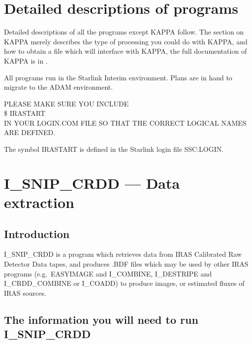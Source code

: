 \documentclass[nolof,noabs,11pt]{starlink}
\begin{document}
\section {Detailed descriptions of programs}


Detailed descriptions of all the programs except KAPPA follow. The section on
KAPPA merely describes the type of processing you could do with KAPPA, and how
to obtain a file which will interface with KAPPA, the full documentation of
KAPPA is in .

All programs run in the Starlink Interim environment. Plans are in hand to
migrate to the ADAM environment.

\begin{center}
\large{PLEASE MAKE SURE YOU INCLUDE
\\
\$ IRASTART
\\
IN YOUR LOGIN.COM FILE SO THAT THE CORRECT LOGICAL NAMES ARE DEFINED.}
\end{center}
The symbol IRASTART is defined in the Starlink login file SSC:LOGIN.

\pagebreak
\section {I\_SNIP\_CRDD --- Data extraction}

\subsection {Introduction}

I\_SNIP\_CRDD is a program which retrieves data from IRAS Calibrated Raw
Detector Data tapes, and produces .BDF files which may be used by other IRAS
programs (e.g.\ EASYIMAGE and I\_COMBINE, I\_DESTRIPE and I\_CRDD\_COMBINE or
I\_COADD) to produce images, or estimated fluxes of IRAS sources.


\subsection {The information you will need to run I\_SNIP\_CRDD}
\end{document}
